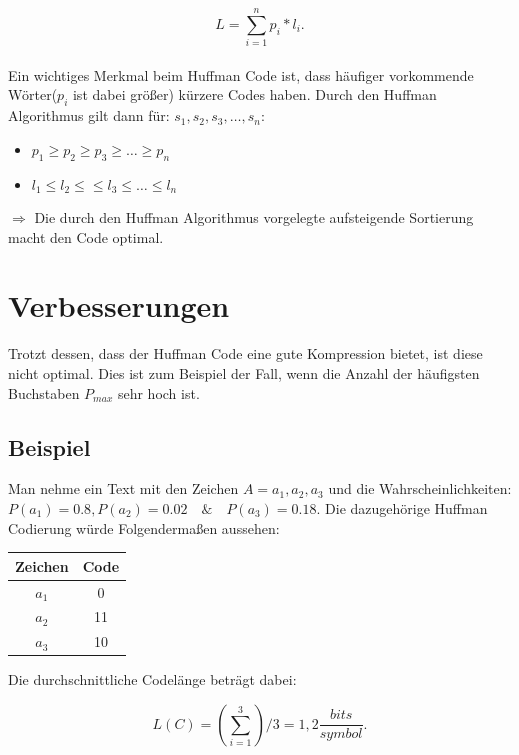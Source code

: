 \documentclass{article}
\begin{document}
\[
L = \sum_{i=1}^{n} p_i * l_i
.\]\\

Ein wichtiges Merkmal beim Huffman Code ist, dass häufiger vorkommende Wörter($p_i$ ist dabei grö{\ss}er) kürzere Codes haben.
Durch den Huffman Algorithmus gilt dann für: $s_1, s_2, s_3, \ldots, s_n$:

\begin{itemize}
    \item $p_1 \ge  p_2 \ge  p_3 \ge  \ldots \ge  p_n$
    \item $l_1 \le  l_2 \le \le  l_3 \le  \ldots \le  l_n$
\end{itemize}

$\Rightarrow$ Die durch den Huffman Algorithmus vorgelegte aufsteigende Sortierung macht den Code optimal.

\section{Verbesserungen}\cite{noauthor_explain_nodate}

Trotzt dessen, dass der Huffman Code eine gute Kompression bietet, ist diese nicht optimal.
Dies ist zum Beispiel der Fall, wenn die Anzahl der häufigsten Buchstaben $P_{max}$ sehr hoch ist.

\subsection{Beispiel}

Man nehme ein Text mit den Zeichen $A = {a_1, a_2, a_3}$ und die Wahrscheinlichkeiten: $P(a_1) = 0.8, P(a_2) = 0.02 \quad \& \quad P(a_3) = 0.18$.
Die dazugehörige Huffman Codierung würde Folgenderma{\ss}en aussehen:

\begin{table}[htpb]
    \centering
    \begin{tabular}{|c c|} 
        \hline
        Zeichen & Code \\
        \hline\hline
        $a_1$ & 0\\
        \hline
        $a_2$ & 11\\
        \hline
        $a_3$ & 10\\
        \hline
    \end{tabular}
\end{table}

Die durchschnittliche Codelänge beträgt dabei:

\[
    L(C)= (\sum_{i=1}^{3}) /3 = 1,2 \frac{bits}{symbol}
.\]
\end{document}
